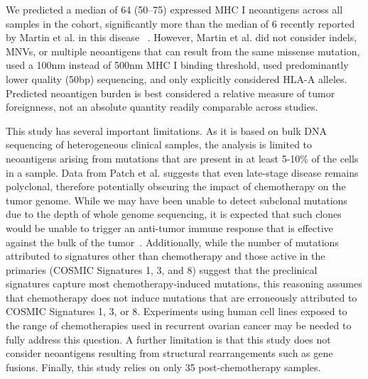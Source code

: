 

We predicted a median of 64 (50--75) expressed MHC I neoantigens across all samples in the cohort, significantly more than the median of 6 recently reported by Martin et al. in this disease ~\cite{Martin_2016}. However, Martin et al. did not consider indels, MNVs, or multiple neoantigens that can result from the same missense mutation, used a 100nm instead of 500nm MHC I binding threshold, used predominantly lower quality (50bp) sequencing, and only explicitly considered HLA-A alleles. Predicted neoantigen burden is best considered a relative measure of tumor foreignness, not an absolute quantity readily comparable across studies.

This study has several important limitations. As it is based on bulk DNA sequencing of heterogeneous clinical samples, the analysis is limited to neoantigens arising from mutations that are present in at least 5-10\% of the cells in a sample. Data from Patch et al. suggests that even late-stage disease remains polyclonal, therefore potentially obscuring the impact of chemotherapy on the tumor genome. While we may have been unable to detect subclonal mutations due to the depth of whole genome sequencing, it is expected that such clones would be unable to trigger an anti-tumor immune response that is effective against the bulk of the tumor~\cite{McGranahan_2016}. Additionally, while the number of mutations attributed to signatures other than chemotherapy and those active in the primaries (COSMIC Signatures 1, 3, and 8) suggest that the preclinical signatures capture most chemotherapy-induced mutations, this reasoning assumes that chemotherapy does not induce mutations that are erroneously attributed to COSMIC Signatures 1, 3, or 8. Experiments using human cell lines exposed to the range of chemotherapies used in recurrent ovarian cancer may be needed to fully address this question. A further limitation is that this study does not consider neoantigens resulting from structural rearrangements such as gene fusions. Finally, this study relies on only 35 post-chemotherapy samples.